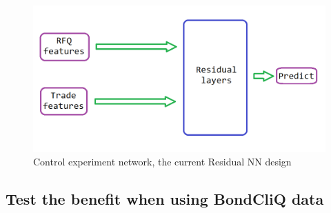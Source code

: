 \documentclass{article}
\begin{document}
\begin{figure}
    \centering
    \includegraphics[scale=0.5]{NN-architecture-1.png}
    \caption{Control experiment network, the current Residual NN design}
    \label{fig:my_label}
\end{figure}

\subsection{Test the benefit when using BondCliQ data}
\end{document}

